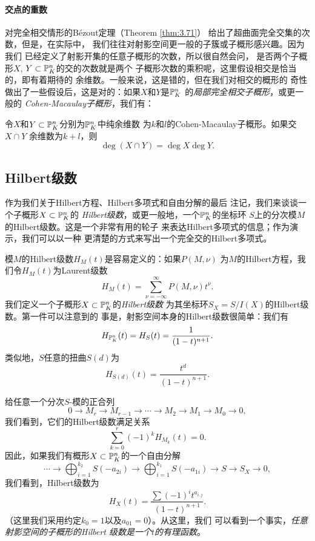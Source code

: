 \paragraph*{交点的重数}
对完全相交情形的B\'ezout定理（Theorem \ref{thm:3.71}）
给出了超曲面完全交集的次数，但是，在实际中，
我们往往对射影空间更一般的子簇或子概形感兴趣。因为我们
已经定义了射影开集的任意子概形的次数，所以很自然会问，
是否两个子概形$X$, $Y\subset \P_K^n$的交的次数就是两个
子概形次数的乘积呢，这里假设相交是恰当的，即有着期待的
余维数。一般来说，这是错的，但在我们对相交的概形的
奇性做出了一些假设后，这是对的：如果$X$和$Y$是$\P_K^n$
的\textit{局部完全相交子概形}，或更一般的
\textit{Cohen-Macaulay子概形}，我们有：

\begin{thm}
\label{thm:3.78}
令$X$和$Y\subset \P_K^n$分别为$\P_K^n$中纯余维数
为$k$和$l$的Cohen-Macaulay子概形。如果交$X\cap Y$
余维数为$k+l$，则
\[
	\deg(X\cap Y)=\deg X\deg Y.
\]
\end{thm}

\begin{exe}\label{exa:3.79}
\nottran 
\end{exe}


\subsection{Hilbert级数}\label{s:3.3.6}

作为我们关于Hilbert方程、Hilbert多项式和自由分解的最后
注记，我们来谈谈一个子概形$X\subset \P_K^n$的
\textit{Hilbert级数}，或更一般地，一个$\P_K^n$的坐标环
$S$上的分次模$M$的Hilbert级数。这是一个非常有用的轮子
来表达Hilbert多项式的信息；作为演示，我们可以以一种
更清楚的方式来写出一个完全交的Hilbert多项式。

模$M$的Hilbert级数$H_M(t)$是容易定义的：如果$P(M,\nu)$
为$M$的Hilbert方程，我们令$H_M(t)$为Laurent级数
\[
	H_M(t)=\sum_{\nu=-\infty}^\infty P(M,\nu)t^\nu.
\]
我们定义一个子概形$X\subset \P_K^n$的\textit{Hilbert级数}
为其坐标环$S_X=S/I(X)$的Hilbert级数。第一件可以注意到的
事是，射影空间本身的Hilbert级数很简单：我们有
\[
	H_{\P^n_K}(t)=H_S(t)=\frac{1}{(1-t)^{n+1}}.
\]
类似地，$S$任意的扭曲$S(d)$为
\[
	H_{S(d)}(t)=\frac{t^d}{(1-t)^{n+1}}.
\]

给任意一个分次$S$-模的正合列
\[
	0\longrightarrow M_r\longrightarrow M_{r-1}
	\longrightarrow \cdots \longrightarrow M_2
	\longrightarrow M_1 \longrightarrow M_0
	\longrightarrow 0,
\]
我们看到，它们的Hilbert级数满足关系
\[
	\sum_{k=0}^r(-1)^k H_{M_k}(t)=0.
\]
因此，如果我们有概形$X\subset \P_K^n$的一个自由分解
\[
	\cdots \longrightarrow \bigoplus_{i=1}^{k_2}
	S(-a_{2i})\longrightarrow \bigoplus_{i=1}^{k_1}
	S(-a_{1i})\longrightarrow S\longrightarrow S_X
	\longrightarrow 0,
\]
我们看到，Hilbert级数为
\[
	H_X(t)=\frac{\sum (-1)^i t^{a_{i,j}}}{(1-t)^{n+1}}.
\]%
（这里我们采用约定$k_0=1$以及$a_{01}=0$）。从这里，我们
可以看到一个事实，\textit{任意射影空间的子概形的Hilbert
级数是一个$t$的有理函数}。

